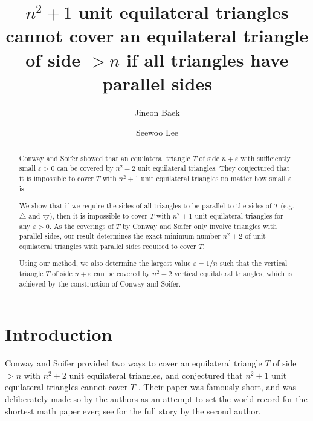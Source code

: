 \documentclass[a4paper]{amsart}
\theoremstyle{plain}
\theoremstyle{definition}
\begin{document}
\title[\(n^2 + 1\) unit vertical triangles cannot cover a triangle of side \(> n\)]{\(n^2 + 1\) unit equilateral triangles cannot cover an equilateral triangle of side \(> n\) if all triangles have parallel sides}

\author{Jineon Baek}
\address{University of Michigan - Ann Arbor}
\author{Seewoo Lee}
\address{University of California - Berkeley}

\begin{abstract}
Conway and Soifer showed that an equilateral triangle \(T\) of side \(n + \varepsilon\) with sufficiently small $\varepsilon > 0$ can be covered by \(n^2 + 2\) unit equilateral triangles.
They conjectured that it is impossible to cover $T$ with \(n^2 + 1\) unit equilateral triangles no matter how small $\varepsilon$ is.

We show that if we require the sides of all triangles to be parallel to the sides of \(T\) (e.g. $\bigtriangleup$ and $\bigtriangledown$), then it is impossible to cover \(T\) with \(n^2 + 1\) unit equilateral triangles for any $\varepsilon > 0$.
As the coverings of $T$ by Conway and Soifer only involve triangles with parallel sides,
our result determines the exact minimum number $n^2+2$ of unit equilateral triangles with parallel sides required to cover $T$.

Using our method, we also determine the largest value $\varepsilon = 1/n$ such that the vertical triangle $T$ of side $n + \varepsilon$ can be covered by $n^2+2$ vertical equilateral triangles,
which is achieved by the construction of Conway and Soifer.
\end{abstract}

\maketitle

\section{Introduction}

Conway and Soifer provided two ways to cover an equilateral triangle $T$ of side $> n$ with \(n^2 + 2\) unit equilateral triangles, and conjectured that $n^2 + 1$ unit equilateral triangles cannot cover $T$ \cite{conway2004coverup, conway2005covering}.
Their paper was famously short, and was deliberately made so by the authors as an attempt to set the world record for the shortest math paper ever; see \cite{soifer2009coffee} for the full story by the second author.
\end{document}
